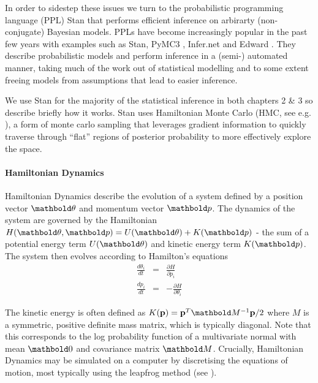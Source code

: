 In order to sidestep these issues we turn to the probabilistic programming language (PPL) Stan \cite{gelman2015stan} that performs efficient inference on arbirarty (non-conjugate) Bayesian models. PPLs have become increasingly popular in the past few years with examples such as Stan, PyMC3 \cite{salvatier2016probabilistic}, Infer.net \cite{wang2011using} and Edward \cite{tran2016edward}. They describe probabilistic models and perform inference in a (semi-) automated manner, taking much of the work out of statistical modelling and to some extent freeing models from assumptions that lead to easier inference.

We use Stan for the majority of the statistical inference in both chapters 2 \& 3 so describe briefly how it works. Stan uses Hamiltonian Monte Carlo (HMC, see e.g. \cite{neal2011mcmc}), a form of monte carlo sampling that leverages gradient information to quickly traverse through ``flat'' regions of posterior probability to more effectively explore the space.

\paragraph{Hamiltonian Dynamics}

Hamiltonian Dynamics describe the evolution of a system defined by a position vector $\mbtheta$ and momentum vector $\mbp$. The dynamics of the system are governed by the Hamiltonian $H(\mbtheta, \mbp) = U(\mbtheta) + K(\mbp)$ - the sum of a potential energy term $U(\mbtheta)$ and kinetic energy term $K(\mbp)$. The system then evolves according to Hamilton's equations
\begin{equation}
\begin{aligned}
\frac{d\theta_i}{dt} & = & \frac{\partial H}{\partial p_i} \\
\frac{dp_i}{dt} & = & -\frac{\partial H}{\partial \theta_i}
\end{aligned} \label{eq:hd}
\end{equation}

The kinetic energy is often defined as $K(\bp) = \bp^T \mbM^{-1} \bp / 2$ where $M$ is a symmetric, positive definite mass matrix, which is typically diagonal. Note that this corresponds to the log probability function of a multivariate normal with mean $\mbzero$ and covariance matrix $\mbM$. Crucially, Hamiltonian Dynamics may be simulated on a computer by discretising the equations of motion, most typically using the leapfrog method (see \cite{neal2011mcmc}).

